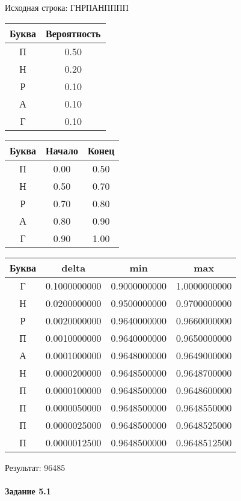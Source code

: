 \documentclass[a4paper, 12pt]{article}
\begin{document}
Исходная строка: ГНРПАНПППП\
\begin{center}
 \begin{tabular}{ |c|c| } 
  \hline
     Буква & Вероятность \\ \hline
П & 0.50\\\hline
Н & 0.20\\\hline
Р & 0.10\\\hline
А & 0.10\\\hline
Г & 0.10
\\ \hline \end{tabular}
\end{center}
\begin{center}
 \begin{tabular}{ |c|c|c| } 
  \hline
     Буква & Начало & Конец \\ \hline
П & 0.00 & 0.50\\\hline
Н & 0.50 & 0.70\\\hline
Р & 0.70 & 0.80\\\hline
А & 0.80 & 0.90\\\hline
Г & 0.90 & 1.00
\\ \hline \end{tabular}
\end{center}
\begin{center}
 \begin{tabular}{ |c|c|c|c| } 
  \hline
     Буква & delta & min & max \\ \hline
Г & 0.1000000000 & 0.9000000000 & 1.0000000000\\\hline
Н & 0.0200000000 & 0.9500000000 & 0.9700000000\\\hline
Р & 0.0020000000 & 0.9640000000 & 0.9660000000\\\hline
П & 0.0010000000 & 0.9640000000 & 0.9650000000\\\hline
А & 0.0001000000 & 0.9648000000 & 0.9649000000\\\hline
Н & 0.0000200000 & 0.9648500000 & 0.9648700000\\\hline
П & 0.0000100000 & 0.9648500000 & 0.9648600000\\\hline
П & 0.0000050000 & 0.9648500000 & 0.9648550000\\\hline
П & 0.0000025000 & 0.9648500000 & 0.9648525000\\\hline
П & 0.0000012500 & 0.9648500000 & 0.9648512500
\\ \hline \end{tabular}
\end{center}
Результат: 96485
\pagebreak
\paragraph{Задание 5.1}
\end{document}
